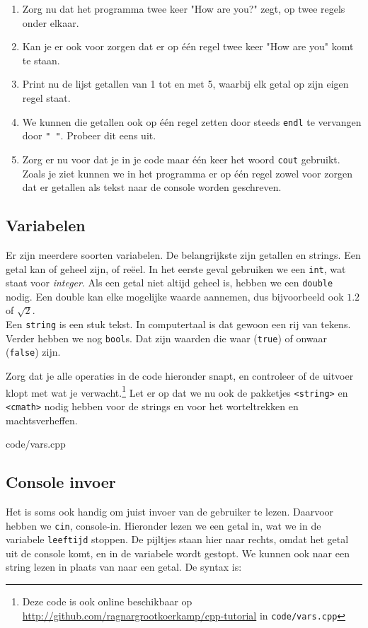 \documentclass[12pt,a4paper]{article}
\newcommand{\code}{}
\newcommand{\icode}{\lstinline}
\newcommand{\mono}{\texttt}
\begin{document}
\begin{enumerate}
		\item
			Zorg nu dat het programma twee keer "How are you?" zegt, op twee regels onder elkaar.
		\item
			Kan je er ook voor zorgen dat er op \'e\'en regel twee keer "How are you" komt te staan.
		\item
			Print nu de lijst getallen van 1 tot en met 5, waarbij elk getal op zijn eigen regel staat.
		\item
			We kunnen die getallen ook op \'e\'en regel zetten door steeds \icode{endl} te vervangen door \icode{" "}. Probeer dit eens uit.
		\item
			Zorg er nu voor dat je in je code maar \'e\'en keer het woord \icode{cout} gebruikt.
			Zoals je ziet kunnen we in het programma er op \'e\'en regel zowel voor zorgen dat er getallen als tekst naar de console worden geschreven. 
\end{enumerate}

\subsection{Variabelen}
Er zijn meerdere soorten variabelen. De belangrijkste zijn getallen en strings. Een getal kan of geheel zijn, of re\"eel. In het eerste geval gebruiken we een \icode{int}, wat staat voor \emph{integer}. Als een getal niet altijd geheel is, hebben we een \icode{double} nodig. Een double kan elke mogelijke waarde aannemen, dus bijvoorbeeld ook $1.2$ of $\sqrt 2$.\\
Een \icode{string} is een stuk tekst. In computertaal is dat gewoon een rij van tekens. Verder hebben we nog \icode{bool}s. Dat zijn waarden die waar (\icode{true}) of onwaar (\icode{false}) zijn.

Zorg dat je alle operaties in de code hieronder snapt, en controleer of de uitvoer klopt met wat je verwacht.\footnote{Deze code is ook online beschikbaar op \url{http://github.com/ragnargrootkoerkamp/cpp-tutorial} in \mono{code/vars.cpp}}
Let er op dat we nu ook de pakketjes \icode{<string>} en \icode{<cmath>} nodig hebben voor de strings en voor het worteltrekken en machtsverheffen.

\code{code/vars.cpp}


\subsection{Console invoer}
Het is soms ook handig om juist invoer van de gebruiker te lezen. Daarvoor hebben we \icode{cin}, console-in. Hieronder lezen we een getal in, wat we in de variabele \icode{leeftijd} stoppen. De pijltjes staan hier naar rechts, omdat het getal uit de console komt, en in de variabele wordt gestopt. We kunnen ook naar een string lezen in plaats van naar een getal. De syntax is: \\
\end{document}
